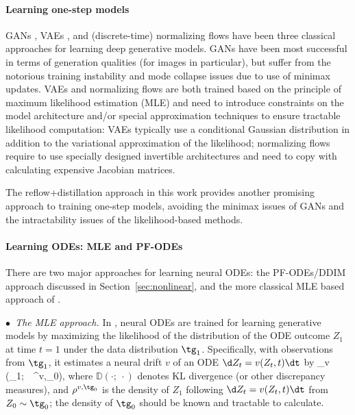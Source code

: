 \documentclass[11pt]{article}
\begin{document}
\paragraph{Learning one-step models}
GANs \citep{goodfellow2014generative, arjovsky2017wasserstein, liu2021fusedream}, VAEs \citep{kingma2013auto}, and (discrete-time) normalizing flows  \citep{rezende2015variational, dinh2014nice,dinh2016density}
have been three classical approaches for learning deep generative models. %
GANs have been most successful in terms of  generation qualities (for images in particular), but suffer from the notorious training instability and mode collapse issues due to use of minimax updates. 
  VAEs and normalizing flows are both trained based on the principle of maximum likelihood estimation (MLE) and  need to introduce constraints on the model architecture and/or special approximation techniques to ensure tractable likelihood computation: 
  VAEs typically use a conditional Gaussian distribution in addition to the variational approximation of the likelihood; 
  normalizing flows require to use specially designed invertible architectures and need to copy with calculating expensive Jacobian matrices.   
 
 The reflow+distillation approach in this work provides another promising approach to  training one-step models,  avoiding the minimax issues of GANs and the intractability issues of the likelihood-based methods. 

\paragraph{Learning ODEs: MLE and PF-ODEs} %
There are two major approaches for learning neural ODEs: 
the PF-ODEs/DDIM approach discussed in Section~\ref{sec:nonlinear}, and the more classical MLE based approach
 of \cite{chen2018neural}. 

\emph{$\bullet$~The MLE approach.}  
In \cite{chen2018neural}, 
neural ODEs are trained 
for learning generative models by maximizing the likelihood of the distribution of the ODE outcome $Z_1$ at time $t=1$ under the data distribution $\tg_1$. Specifically, 
with observations from $\tg_1$, it estimates a neural drift $v$ of an ODE  $\d Z_t = v(Z_t,t)\dt $ by 
\bbb \label{equ:neuralode}
\max_{v}  (\tg_1;~~\rho^{v,\tg_0}), 
\eee 
where $\mathbb{D}(\cdot;~\cdot)$ denotes 
KL divergence (or other discrepancy measures),  and $\rho^{v,\tg_0}$ is the density of $Z_1$ following $\d Z_t = v(Z_t,t)\dt $ from $Z_0\sim \tg_0$; the density of $\tg_0$ should be known and tractable to calculate. 
\end{document}
